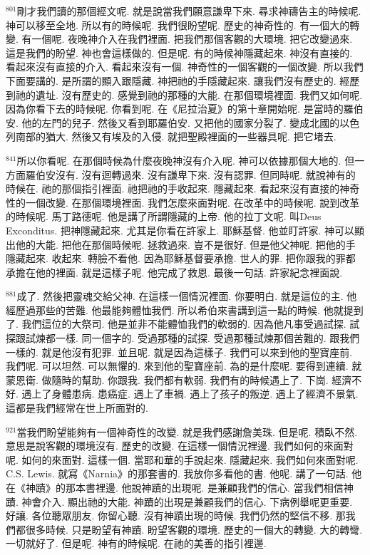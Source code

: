 \documentclass{book}
\begin{document}
$^{801}$剛才我們讀的那個經文呢.
就是說當我們願意謙卑下來.
尋求神禱告主的時候呢.
神可以移至全地.
所以有的時候呢.
我們很盼望呢.
歷史的神奇性的.
有一個大的轉變.
有一個呢.
夜晚神介入在我們裡面.
把我們那個客觀的大環境.
把它改變過來.
這是我們的盼望.
神也會這樣做的.
但是呢.
有的時候神隱藏起來.
神沒有直接的.
看起來沒有直接的介入.
看起來沒有一個.
神奇性的一個客觀的一個改變.
所以我們下面要講的.
是所謂的顯入跟隱藏.
神把祂的手隱藏起來.
讓我們沒有歷史的.
經歷到祂的遺址.
沒有歷史的.
感覺到祂的那種的大能.
在那個環境裡面.
我們又如何呢.
因為你看下去的時候呢.
你看到呢.
在《尼拉治夏》的第十章開始呢.
是當時的羅伯安.
他的左門的兒子.
然後又看到耶羅伯安.
又把他的國家分裂了.
變成北國的以色列南部的猶大.
然後又有埃及的入侵.
就把聖殿裡面的一些器具呢.
把它堵去.

$^{841}$所以你看呢.
在那個時候為什麼夜晚神沒有介入呢.
神可以依據那個大地的.
但一方面羅伯安沒有.
沒有迴轉過來.
沒有謙卑下來.
沒有認罪.
但同時呢.
就說神有的時候在.
祂的那個指引裡面.
祂把祂的手收起來.
隱藏起來.
看起來沒有直接的神奇性的一個改變.
在那個環境裡面.
我們怎麼來面對呢.
在改革中的時候呢.
說到改革的時候呢.
馬丁路德呢.
他是講了所謂隱藏的上帝.
他的拉丁文呢.
叫Deus Exconditus.
把神隱藏起來.
尤其是你看在許家上.
耶穌基督.
他並盯許家.
神可以顯出他的大能.
把他在那個時候呢.
拯救過來.
豈不是很好.
但是他父神呢.
把他的手隱藏起來.
收起來.
轉臉不看他.
因為耶穌基督要承擔.
世人的罪.
把你跟我的罪都承擔在他的裡面.
就是這樣子呢.
他完成了救恩.
最後一句話.
許家紀念裡面說.

$^{881}$成了.
然後把靈魂交給父神.
在這樣一個情況裡面.
你要明白.
就是這位的主.
他經歷過那些的苦難.
他最能夠體恤我們.
所以希伯來書講到這一點的時候.
他就提到了.
我們這位的大祭司.
他是並非不能體恤我們的軟弱的.
因為他凡事受過試探.
試探跟試煉都一樣.
同一個字的.
受過那種的試探.
受過那種試煉那個苦難的.
跟我們一樣的.
就是他沒有犯罪.
並且呢.
就是因為這樣子.
我們可以來到他的聖寶座前.
我們呢.
可以坦然.
可以無懼的.
來到他的聖寶座前.
為的是什麼呢.
要得到連續.
就蒙恩衛.
做隨時的幫助.
你跟我.
我們都有軟弱.
我們有的時候遇上了.
下崗.
經濟不好.
遇上了身體患病.
患癌症.
遇上了車禍.
遇上了孩子的叛逆.
遇上了經濟不景氣.
這都是我們經常在世上所面對的.

$^{921}$當我們盼望能夠有一個神奇性的改變.
就是我們感謝詹美珠.
但是呢.
積臥不然.
意思是說客觀的環境沒有.
歷史的改變.
在這樣一個情況裡邊.
我們如何的來面對呢.
如何的來面對.
這樣一個.
當耶和華的手說起來.
隱藏起來.
我們如何來面對呢.
C.S. Lewis.
就寫《Narnia》的那套書的.
我放你多看他的書.
他呢.
講了一句話.
他在《神蹟》的那本書裡邊.
他說神蹟的出現呢.
是兼顧我們的信心.
當我們相信神蹟.
神會介入.
顯出祂的大能.
神蹟的出現是兼顧我們的信心.
下病例舉呢更重要.
好讓.
各位聽眾朋友.
你留心聽.
沒有神蹟出現的時候.
我們仍然的堅信不移.
那我們都很多時候.
只是盼望有神蹟.
盼望客觀的環境.
歷史的一個大的轉變.
大的轉彎.
一切就好了.
但是呢.
神有的時候呢.
在祂的美善的指引裡邊.
\end{document}
